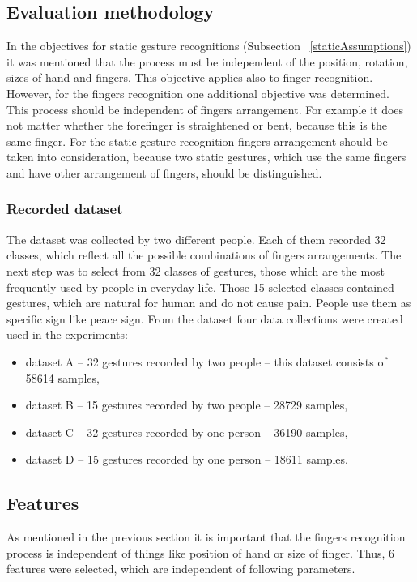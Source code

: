 \subsection{Evaluation methodology} \label{fdEvaluationMethodology}
In the objectives for static gesture recognitions (Subsection ~\ref{staticAssumptions}) it was mentioned that the process must be independent of the position, rotation, sizes of hand and fingers. This objective applies also to finger recognition. However, for the fingers recognition one additional objective was determined. This process should be independent of fingers arrangement. For example it does not matter whether the forefinger is straightened or bent, because this is the same finger. For the static gesture recognition fingers arrangement should be taken into consideration, because two static gestures, which use the same fingers and have other arrangement of fingers, should be distinguished.

\subsubsection{Recorded dataset}
The dataset was collected by two different people. Each of them  recorded 32 classes, which reflect all the possible combinations of fingers arrangements. The next step was to select from 32 classes of gestures, those which are the most frequently used by people in everyday life. Those 15 selected classes contained gestures, which are natural for human and do not cause pain. People use them as specific sign like peace sign. From the dataset four data collections were created used in the experiments:
\begin{itemize}
\item dataset A -- 32 gestures recorded by two people -- this dataset consists of 58614 samples,
\item dataset B -- 15 gestures recorded by two people -- 28729 samples,
\item dataset C -- 32 gestures recorded by one person -- 36190 samples,
\item dataset D -- 15 gestures recorded by one person -- 18611 samples.
\end{itemize}

\subsection{Features}
As mentioned in the previous section it is important that the fingers recognition process is independent of things like position of hand or size of finger. Thus, 6 features were selected, which are independent of following parameters. 

